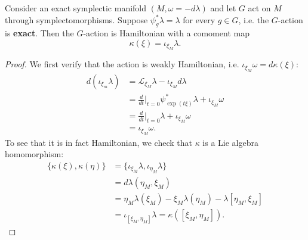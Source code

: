 \documentclass{amsart}
\begin{document}
\begin{proposition}
    Consider an exact symplectic manifold $(M,\omega=-d\lambda)$ and let $G$ act
    on $M$ through symplectomorphisms. Suppose $\psi_g^*\lambda=\lambda$ for every
    $g\in G$, i.e. the $G$-action is \textbf{exact}. Then the $G$-action is Hamiltonian
    with a comoment map
    \begin{equation*}
        \kappa(\xi) = \iota_{\xi_M}\lambda.
    \end{equation*}
\end{proposition}
\begin{proof}
    We first verify that the action is weakly Hamiltonian, i.e. $\iota_{\xi_M}\omega = d\kappa(\xi)$:
    \begin{align*}
        d\left( \iota_{\xi_m}\lambda \right)&=\mathcal{L}_{\xi_M}\lambda - \iota_{\xi_M}d\lambda\\
        &=\frac{d}{dt}\bigg|_{t=0}\psi^*_{\exp(t\xi)}\lambda+\iota_{\xi_M}\omega\\
        &=\frac{d}{dt}\bigg|_{t=0}\lambda+\iota_{\xi_M}\omega\\
        &=\iota_{\xi_M}\omega.
    \end{align*}
    To see that it is in fact Hamiltonian, we check that $\kappa$ is a Lie algebra homomorphism:
    \begin{align*}
        \{\kappa(\xi),\kappa(\eta)\} &= \{\iota_{\xi_M}\lambda,\iota_{\eta_M}\lambda\}\\
        &= d\lambda(\eta_M,\xi_M)\\
        &=\eta_M\lambda(\xi_M) - \xi_M\lambda(\eta_M)-\lambda[\eta_M,\xi_M]\\
        &=\iota_{[\xi_M,\eta_M]}\lambda=\kappa([\xi_M,\eta_M]).
    \end{align*}
\end{proof}
\end{document}
